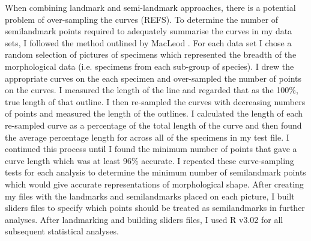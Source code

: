 When combining landmark and semi-landmark approaches, there is a potential problem of over-sampling the curves (REFS). To determine the number of semilandmark points required to adequately summarise the curves in my data sets,  I followed the method outlined by MacLeod \citeyearpar{MacLeod2012}. For each data set I chose a random selection of pictures of specimens which represented the breadth of the morphological data (i.e. specimens from each sub-group of species).  I drew the appropriate curves on the each specimen and over-sampled the number of points on the curves. I measured the length of the line and regarded that as the 100\%, true length of that outline. I then re-sampled the curves with decreasing numbers of points and measured the length of the outlines. I calculated the length of each re-sampled curve as a percentage of the total length of the curve and then found the average percentage length for across all of the specimens in my test file. I continued this process until I found the minimum number of points that gave a curve length which was at least 96\% accurate.  I repeated these curve-sampling tests for each analysis to determine the minimum number of semilandmark points which would give accurate representations of morphological shape.
After creating my files with the landmarks and semilandmarks placed on each picture, I built sliders files \citep{Zelditch2012} to specify which points should be treated as semilandmarks in further analyses. After landmarking and building sliders files, I used R v3.02 \citep[R Development Core]{Team2013} for all subsequent statistical analyses.



